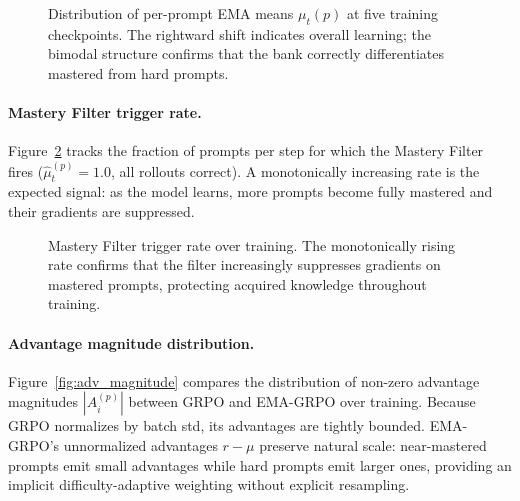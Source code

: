 \documentclass[11pt]{article}
\newcommand{\method}{EMA-GRPO}
\theoremstyle{definition}
\begin{document}
\begin{figure}[t]
\centering
{}
\caption{Distribution of per-prompt EMA means $\mu_t(p)$ at five training
  checkpoints. The rightward shift indicates overall learning; the bimodal
  structure confirms that the bank correctly differentiates mastered from
  hard prompts.}
\label{fig:ema_dist}
\end{figure}

\paragraph{Mastery Filter trigger rate.}
Figure~\ref{fig:filter_rate} tracks the fraction of prompts per step for
which the Mastery Filter fires ($\hat{\mu}_t^{(p)} = 1.0$, all rollouts
correct).
A monotonically increasing rate is the expected signal: as the model learns,
more prompts become fully mastered and their gradients are suppressed.

\begin{figure}[t]
\centering
{}
\caption{Mastery Filter trigger rate over training. The monotonically rising
  rate confirms that the filter increasingly suppresses gradients on mastered
  prompts, protecting acquired knowledge throughout training.}
\label{fig:filter_rate}
\end{figure}

\paragraph{Advantage magnitude distribution.}
Figure~\ref{fig:adv_magnitude} compares the distribution of non-zero advantage
magnitudes $|A_i^{(p)}|$ between GRPO and \method{} over training.
Because GRPO normalizes by batch std, its advantages are tightly bounded.
\method{}'s unnormalized advantages $r - \mu$ preserve natural scale:
near-mastered prompts emit small advantages while hard prompts emit larger
ones, providing an implicit difficulty-adaptive weighting without explicit
resampling.
\end{document}
